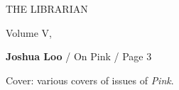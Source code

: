 %
%
%

\pagestyle{empty}

\begin{center}

\null
\vspace{\fill}

{\fontsize{32}{48}\selectfont
{THE LIBRARIAN}}
\vspace{1.2em}

Volume V, 

\vspace{1.2em}

\Large
\textbf{Joshua Loo} / On Pink / Page 3
\normalsize

\vspace{1.2em}

Cover: various covers of issues of \textit{Pink}.

%

\end{center}

%